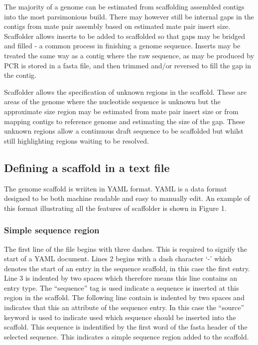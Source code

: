 \documentclass[10pt]{bmc_article}
\newenvironment{bmcformat}{\begin{raggedright}\baselineskip20pt\sloppy\setboolean{publ}{false}}{\end{raggedright}\baselineskip20pt\sloppy}
\begin{document}
\begin{bmcformat}
The majority of a genome can be estimated from scaffolding assembled contigs
into the most parsimonious build. There may however still be internal gaps in
the contigs from mate pair assembly based on estimated mate pair insert size.
Scaffolder allows inserts to be added to scaffolded so that gaps may be bridged
and filled - a common process in finishing a genome sequence. Inserts may be
treated the same way as a contig where the raw sequence, as may be produced by
PCR is stored in a fasta file, and then trimmed and/or reversed to fill the gap
in the contig. \pb

Scaffolder allows the specification of unknown regions in the scaffold. These
are areas of the genome where the nucleotide sequence is unknown but the
approximate size region may be estimated from mate pair insert size or from
mapping contigs to reference genome and estimating the size of the gap. These
unknown regions allow a continuous draft sequence to be scaffolded but whilst
still highlighting regions waiting to be resolved. \pb

\subsection*{Defining a scaffold in a text file} %

The genome scaffold is wriiten in YAML format. YAML is a data format designed
to be both machine readable and easy to manually edit. An example of this
format illustrating all the features of scaffolder is shown in Figure 1. \pb

\subsubsection*{Simple sequence region} %

The first line of the file begins with three dashes. This is required to
signify the start of a YAML document. Lines 2 begins with a dash character `-'
which denotes the start of an entry in the sequence scaffold, in this case the
first entry. Line 3 is indented by two spaces which therefore means this line
contains an entry type. The ``sequence'' tag is used indicate a sequence is
inserted at this region in the scaffold. The following line contain is
indented by two spaces and indicates that this an attribute of the sequence
entry. In this case the ``source'' keyword is used to indicate used which
sequence should be inserted into the scaffold. This sequence is indentified by
the first word of the fasta header of the selected sequence. This indicates
a simple sequence region added to the scaffold. \pb


\end{bmcformat}
\end{document}

